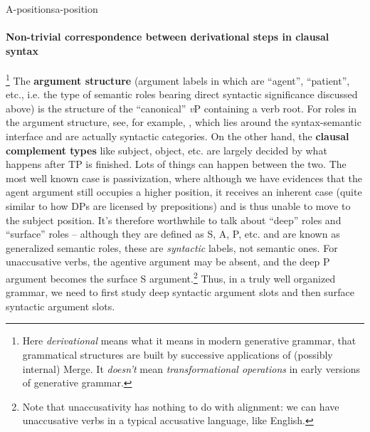 \documentclass[a4paper, oneside]{report}
\newcommand*{\citesec}[1]{\S~{#1}}
\newcommand*{\concept}[1]{\textbf{#1}}
\newcommand*{\term}[1]{\emph{#1}}
\newcommand{\vP}{\textit{v}P}
\begin{document}
\begin{theorybox}{A-positions}{a-position}
    \paragraph*{Non-trivial correspondence between derivational steps in clausal syntax}%
    \footnote{
        Here \term{derivational} means what it means in modern generative grammar, 
        that grammatical structures are built by successive applications of (possibly internal) Merge.
        It \emph{doesn't} mean \emph{transformational operations}
        in early versions of generative grammar.
    }
    The \concept{argument structure} 
    (argument labels in which are ``agent'', ``patient'', etc., 
    i.e. the type of semantic roles bearing direct syntactic significance 
    discussed above)
    is the structure of the ``canonical'' \vP{} containing a verb root.
    For roles in the argument structure, 
    see, for example, \citet[\citesec{4.2}]{cgel}, 
    which lies around the syntax-semantic interface 
    and are actually syntactic categories.
    On the other hand, 
    the \concept{clausal complement types} 
    like subject, object, etc.
    are largely decided by what happens after TP is finished.
    Lots of things can happen between the two.
    The most well known case is passivization,
    where although we have evidences that the agent argument still occupies a higher position,
    it receives an inherent case (quite similar to how DPs are licensed by prepositions)
    and is thus unable to move to the subject position.
    It's therefore worthwhile to talk about ``deep'' roles and ``surface'' roles
    -- although they are defined as S, A, P, etc.
    and are known as generalized semantic roles, 
    these are \emph{syntactic} labels, not semantic ones.
    For unaccusative verbs, 
    the agentive argument may be absent, 
    and the deep P argument becomes the surface S argument.\footnote{
        Note that unaccusativity has nothing to do with alignment:
        we can have unaccusative verbs in a typical accusative language, like English.
    }
    Thus, in a truly well organized grammar, 
    we need to first study deep syntactic argument slots 
    and then surface syntactic argument slots.


\end{theorybox}
\end{document}
